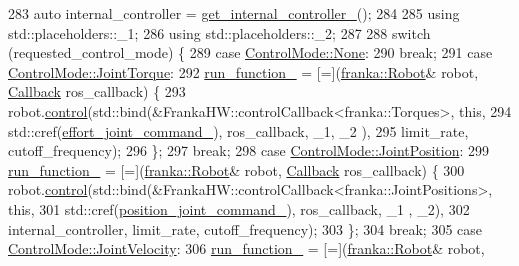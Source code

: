 \begin{DoxyCode}
283   \textcolor{keyword}{auto} internal\_controller = \hyperlink{classfranka__hw_1_1FrankaHW_a0e2aab0e386f9ed57345cd56f02643ac}{get\_internal\_controller\_}();
284 
285   \textcolor{keyword}{using} std::placeholders::\_1;
286   \textcolor{keyword}{using} std::placeholders::\_2;
287 
288   \textcolor{keywordflow}{switch} (requested\_control\_mode) \{
289     \textcolor{keywordflow}{case} \hyperlink{namespacefranka__hw_afa416558ce4baace5ac6c71bd5d2c98ca6adf97f83acf6453d4a6a4b1070f3754}{ControlMode::None}:
290       \textcolor{keywordflow}{break};
291     \textcolor{keywordflow}{case} \hyperlink{namespacefranka__hw_afa416558ce4baace5ac6c71bd5d2c98ca6c640e0814bb12aecaa28d237d393467}{ControlMode::JointTorque}:
292       \hyperlink{classfranka__hw_1_1FrankaHW_ab53d17aecdb62936defdcde99e9b88b8}{run\_function\_} = [=](\hyperlink{classfranka_1_1Robot}{franka::Robot}& robot, 
      \hyperlink{classfranka__hw_1_1FrankaHW_ac576bd5140a03864888c68519daa5aa4}{Callback} ros\_callback) \{
293         robot.\hyperlink{classfranka_1_1Robot_a5b5ba0a4f2bfd20be963b05622e629e1}{control}(std::bind(&FrankaHW::controlCallback<franka::Torques>, \textcolor{keyword}{this},
294                                 std::cref(\hyperlink{classfranka__hw_1_1FrankaHW_a718469d0646cacde1bd8ad1b798a528c}{effort\_joint\_command\_}), ros\_callback, \_1, \_2
      ),
295                       limit\_rate, cutoff\_frequency);
296       \};
297       \textcolor{keywordflow}{break};
298     \textcolor{keywordflow}{case} \hyperlink{namespacefranka__hw_afa416558ce4baace5ac6c71bd5d2c98caa10d0bc4b1db478900a14e066c4c3333}{ControlMode::JointPosition}:
299       \hyperlink{classfranka__hw_1_1FrankaHW_ab53d17aecdb62936defdcde99e9b88b8}{run\_function\_} = [=](\hyperlink{classfranka_1_1Robot}{franka::Robot}& robot, 
      \hyperlink{classfranka__hw_1_1FrankaHW_ac576bd5140a03864888c68519daa5aa4}{Callback} ros\_callback) \{
300         robot.\hyperlink{classfranka_1_1Robot_a5b5ba0a4f2bfd20be963b05622e629e1}{control}(std::bind(&FrankaHW::controlCallback<franka::JointPositions>, \textcolor{keyword}{this},
301                                 std::cref(\hyperlink{classfranka__hw_1_1FrankaHW_a21bc8c749210aa50ac5a847065d01042}{position\_joint\_command\_}), ros\_callback, \_1
      , \_2),
302                       internal\_controller, limit\_rate, cutoff\_frequency);
303       \};
304       \textcolor{keywordflow}{break};
305     \textcolor{keywordflow}{case} \hyperlink{namespacefranka__hw_afa416558ce4baace5ac6c71bd5d2c98cab71066787fa2ea98f88027078359cd93}{ControlMode::JointVelocity}:
306       \hyperlink{classfranka__hw_1_1FrankaHW_ab53d17aecdb62936defdcde99e9b88b8}{run\_function\_} = [=](\hyperlink{classfranka_1_1Robot}{franka::Robot}& robot, 

\end{DoxyCode}
